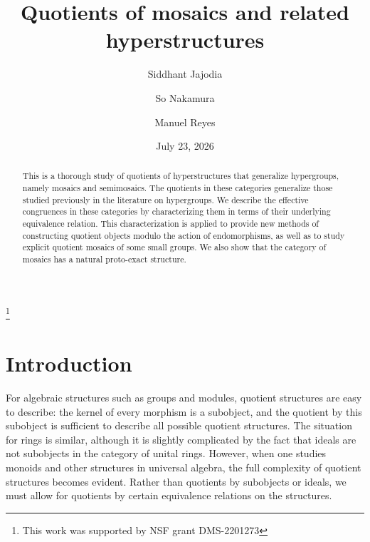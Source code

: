 \documentclass[reqno]{amsart}
\numberwithin{equation}{section}
\theoremstyle{plain}
\theoremstyle{definition}
\begin{document}
\title[Quotient hyperstructures]{Quotients of mosaics and related hyperstructures}
\author{Siddhant Jajodia}
\author{So Nakamura}
\author{Manuel Reyes}
\address{Department of Mathematics\\ University of California, Irvine \\
340 Rowland Hall\\ Irvine, CA 96267--3875 \\ USA}


\date{July 23, 2026}
\thanks{This work was supported by NSF grant DMS-2201273}

\begin{abstract}
This is a thorough study of quotients of hyperstructures that generalize hypergroups, namely mosaics and semimosaics. The quotients in these categories generalize those studied previously in the literature on hypergroups. We describe the effective congruences in these categories by characterizing them in terms of their underlying equivalence relation. This characterization is applied to provide new methods of constructing quotient objects modulo the action of endomorphisms, as well as to study explicit quotient mosaics of some small groups. 
We also show that the category of mosaics has a natural proto-exact structure.
\end{abstract}

\maketitle

\setcounter{tocdepth}{1} %
\makeatletter
\def\l@subsection{\@tocline{2}{0pt}{2.5pc}{5pc}{}}
\def\l@subsubsection{\@tocline{2}{0pt}{5pc}{7.5pc}{}} %
\makeatother

\section{Introduction}
\label{sec:intro}

For algebraic structures such as groups and modules, quotient structures are easy to describe: the kernel of every morphism is a subobject, and the quotient by this subobject is sufficient to describe all possible quotient structures.
The situation for rings is similar, although it is slightly complicated by the fact that ideals are not subobjects in the category of unital rings. However, when one studies monoids and other structures in universal algebra, the full complexity of quotient structures becomes evident. 
Rather than quotients by subobjects or ideals, we must allow for quotients by certain equivalence relations on the structures.
\end{document}

